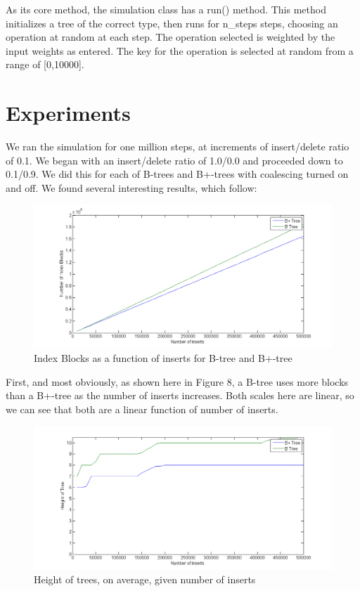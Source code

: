 \documentclass[fleqn]{article}
\begin{document}
As its core method, the simulation class has a run() method.  This method initializes a tree of the correct type, then runs for n\_steps steps, choosing an operation at random at each step.  The operation selected is weighted by the input weights as entered.  The key for the operation is selected at random from a range of [0,10000].

\section{Experiments}

We ran the simulation for one million steps, at increments of insert/delete ratio of 0.1.  We began with an insert/delete ratio of 1.0/0.0 and proceeded down to 0.1/0.9.  We did this for each of B-trees and B+-trees with coalescing turned on and off.  We found several interesting results, which follow:\\

\begin{figure}[h!]
\centerline{\includegraphics[width=1.2\linewidth]{Images/figure1.png}}
\caption{Index Blocks as a function of inserts for B-tree and B+-tree}
\end{figure}

First, and most obviously, as shown here in Figure 8, a B-tree uses more blocks than a B+-tree as the number of inserts increases.  Both scales here are linear, so we can see that both are a linear function of number of inserts.\\

\begin{figure}[h!]
\centerline{\includegraphics[width=1.2\linewidth]{Images/figure2.png}}
\caption{Height of trees, on average, given number of inserts}
\end{figure}
\end{document}
